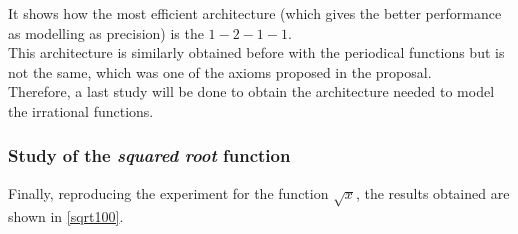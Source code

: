\documentclass[a4paper, 11pt]{article}
\begin{document}
It shows how the most efficient architecture (which gives the better performance as modelling as precision) is the $1-2-1-1$.\\
This architecture is similarly obtained before with the periodical functions but is not the same, which was one of the axioms proposed in the proposal.\\
Therefore, a last study will be done to obtain the architecture needed to model the irrational functions.
\newpage

\subsubsection{Study of the \textit{squared root} function}
Finally, reproducing the experiment for the function $\sqrt{x}$, the results obtained are shown in \ref{sqrt100}.
\begin{figure}[h]
    \centering
    \hspace{1em}
    \\

\end{figure}
\end{document}
